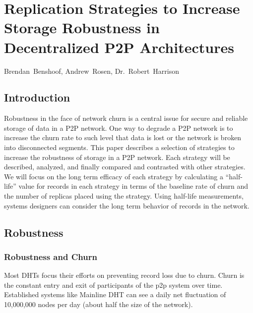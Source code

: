\chapter{Replication Strategies to Increase Storage Robustness in Decentralized P2P Architectures}
%
%
%
\begin{center}
Brendan~Benshoof, Andrew~Rosen, Dr.~Robert~Harrison
\end{center}



\section{Introduction}

Robustness in the face of network churn is a central issue for secure and reliable storage of data in a P2P network. 
One way to degrade a P2P network is to increase the churn rate to such  level that data is lost or the network is broken into disconnected segments. 
This paper describes a selection of strategies to increase the robustness of storage in a P2P network.
Each strategy will be described, analyzed, and finally compared and contrasted with other strategies.
We will focus on the long term efficacy of each strategy by calculating a ``half-life'' value for records in each strategy in terms of the baseline rate of churn and the number of replicas placed using the strategy.
Using half-life measurements, systems designers can consider the long term behavior of records in the network.





\section{Robustness}

\subsection{Robustness and Churn}
Most DHTs focus their efforts on preventing record loss due to churn.
Churn is the constant entry and exit of participants of the p2p system over time.
Established systems like Mainline DHT can see a daily net fluctuation of 10,000,000 nodes per day \cite{wang2013measuring} (about half the size of the network). 

